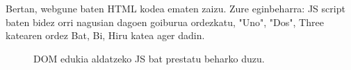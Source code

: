 Bertan, webgune baten HTML kodea ematen zaizu. Zure eginbeharra: JS \mbox{script} baten bidez orri nagusian dagoen goiburua ordezkatu, "Uno", "Dos", \mbox{\textquotedbl{}Three\textquotedbl{}} katearen ordez \textquotedbl{}Bat\textquotedbl{}, \textquotedbl{}Bi\textquotedbl{}, \textquotedbl{}Hiru\textquotedbl{} katea ager dadin.

\begin{figure}[ht]
	\centering
{}
\caption{DOM edukia aldatzeko JS bat prestatu beharko duzu.}
\label{fig:onload}
\end{figure}